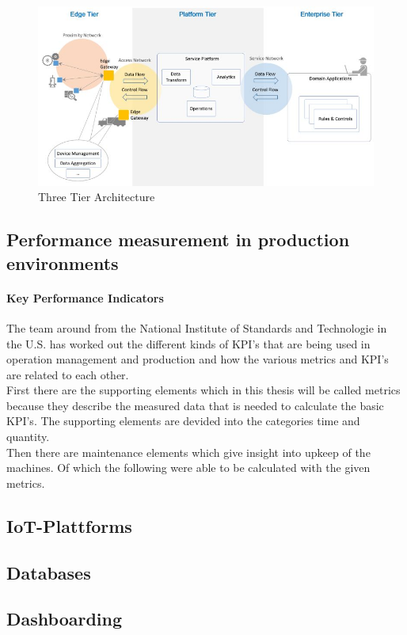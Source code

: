 \begin{figure}[H]
	\includegraphics[width=\linewidth]{pic/three-tier-architecture.jpg}
	\caption{Three Tier Architecture}
	\label{fig:Three-Tier-Architecture}
\end{figure}
\subsection{Performance measurement in production environments}
\paragraph{Key Performance Indicators}
The team around \cite{kangHierarchicalStructureKey2016} from the National Institute of Standards and Technologie in the U.S. has worked out the different kinds of KPI's that are being used in operation management and production and how the various metrics and KPI's are related to each other.
\\First there are the supporting elements which in this thesis will be called metrics because they describe the measured data that is needed to calculate the basic KPI's. The supporting elements are devided into the categories time and quantity.
\\Then there are maintenance elements which give insight into upkeep of the machines. Of which the following were able to be calculated with the given metrics.
\\
\subsection{IoT-Plattforms}

\subsection{Databases}
\subsection{Dashboarding}


